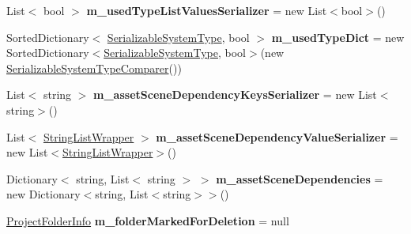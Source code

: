 \begin{DoxyCompactItemize}
\item 
\mbox{\label{class_asset_hunter_main_window_a651cbc0e66701dc4cc33dd5c38c49a45}} 
List$<$ bool $>$ {\bfseries m\+\_\+used\+Type\+List\+Values\+Serializer} = new List$<$bool$>$()
\item 
\mbox{\label{class_asset_hunter_main_window_a40bff2af908ed61ce238c90ba0d7d739}} 
Sorted\+Dictionary$<$ \hyperlink{class_heureka_games_1_1_serializable_system_type}{Serializable\+System\+Type}, bool $>$ {\bfseries m\+\_\+used\+Type\+Dict} = new Sorted\+Dictionary$<$\hyperlink{class_heureka_games_1_1_serializable_system_type}{Serializable\+System\+Type}, bool$>$(new \hyperlink{class_heureka_games_1_1_serializable_system_type_comparer}{Serializable\+System\+Type\+Comparer}())
\item 
\mbox{\label{class_asset_hunter_main_window_a451b3c0fd93bd7cedbc933e98d78e7c7}} 
List$<$ string $>$ {\bfseries m\+\_\+asset\+Scene\+Dependency\+Keys\+Serializer} = new List$<$string$>$()
\item 
\mbox{\label{class_asset_hunter_main_window_a6aa55ff8feb1779558fd917548c2ecb5}} 
List$<$ \hyperlink{class_string_list_wrapper}{String\+List\+Wrapper} $>$ {\bfseries m\+\_\+asset\+Scene\+Dependency\+Value\+Serializer} = new List$<$\hyperlink{class_string_list_wrapper}{String\+List\+Wrapper}$>$()
\item 
\mbox{\label{class_asset_hunter_main_window_a371c403cd7c08eb794b40eb4619b36fb}} 
Dictionary$<$ string, List$<$ string $>$ $>$ {\bfseries m\+\_\+asset\+Scene\+Dependencies} = new Dictionary$<$string, List$<$string$>$$>$()
\item 
\mbox{\label{class_asset_hunter_main_window_a2b1c674b2d6a03f19066ddaa5aafc4b1}} 
\hyperlink{class_heureka_games_1_1_project_folder_info}{Project\+Folder\+Info} {\bfseries m\+\_\+folder\+Marked\+For\+Deletion} = null
\end{DoxyCompactItemize}
